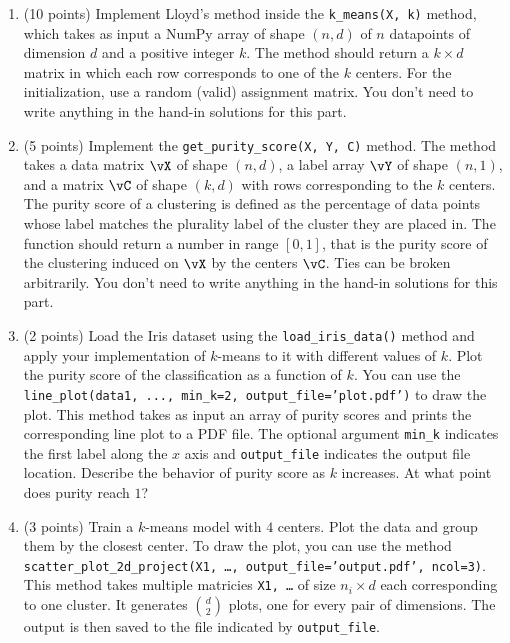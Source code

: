 \documentclass{article}
\begin{document}
\begin{enumerate}
\begin{Q}
  \begin{enumerate}
    \item (10 points)
      Implement Lloyd's method inside the \texttt{k\_means(X, k)} method, which takes as input a NumPy array of shape $(n, d)$ of $n$ datapoints of dimension $d$ and a positive integer $k$. The method should return a $k \times d$ matrix in which each row corresponds to one of the $k$ centers.  For the initialization, use a random (valid) assignment matrix. You don't need to write anything in the hand-in solutions for this part.

    \item (5 points)
      Implement the \texttt{get\_purity\_score(X, Y, C)} method. The method takes a data matrix $\vX$ of shape $(n,d)$, a label array $\vY$ of shape $(n,1)$, and a matrix $\vC$ of shape $(k,d)$ with rows corresponding to the $k$ centers. The purity score of a clustering is defined as the percentage of data points whose label matches the plurality label of the cluster they are placed in. The function should return a number in range $[0,1]$, that is the purity score of the clustering induced on $\vX$ by the centers $\vC$. Ties can be broken arbitrarily. You don't need to write anything in the hand-in solutions for this part.

    \item (2 points)
      Load the Iris dataset using the \texttt{load\_iris\_data()}
      method and apply your implementation of $k$-means to it with
      different values of $k$. Plot the purity score of the
      classification as a function of $k$. You can use the
      \texttt{line\_plot(data1, ..., min\_k=2,
        output\_file='plot.pdf')} to draw the plot. This method takes
      as input an array of purity scores and prints the corresponding
      line plot to a PDF file. The optional argument \texttt{min\_k}
      indicates the first label along the $x$ axis and
      \texttt{output\_file} indicates the output file
      location. Describe the behavior of purity score as $k$
      increases. At what point does purity reach $1$? \label{kmc-c}



\item (3 points)
      Train a $k$-means model with $4$ centers. Plot the data and
      group them by the closest center. To draw the plot, you can use
      the method \texttt{scatter\_plot\_2d\_project(X1, \ldots,
        output\_file='output.pdf', ncol=3)}. This method takes
      multiple matricies \texttt{X1, \ldots} of size $n_i \times d$
      each corresponding to one cluster. It generates ${d \choose 2}$
      plots, one for every pair of dimensions. The output is then
      saved to the file indicated by \texttt{output\_file}. \label{kmc-g}



\end{enumerate}
\end{Q}
\end{enumerate}
\end{document}
